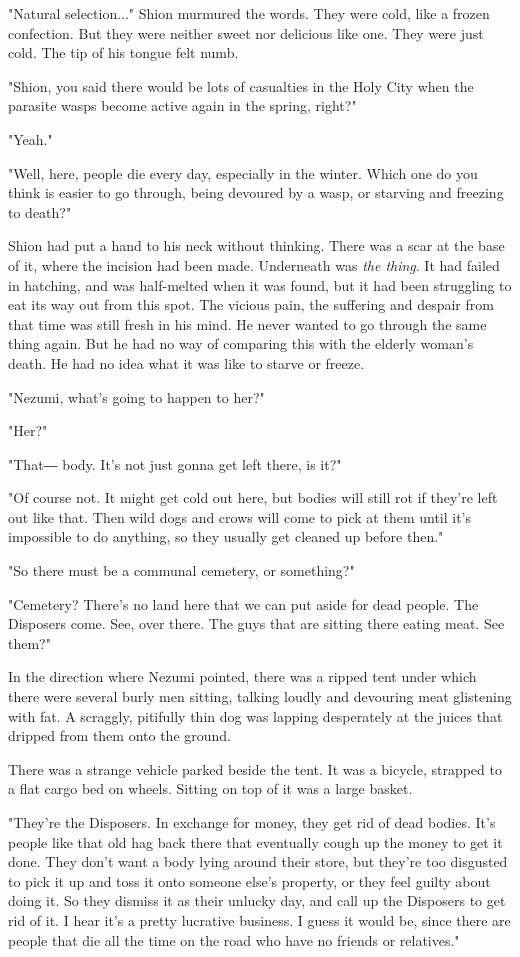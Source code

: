 "Natural selection..." Shion murmured the words. They were cold, like a
frozen confection. But they were neither sweet nor delicious like one.
They were just cold. The tip of his tongue felt numb.

"Shion, you said there would be lots of casualties in the Holy City when
the parasite wasps become active again in the spring, right?"

"Yeah."

"Well, here, people die every day, especially in the winter. Which one
do you think is easier to go through, being devoured by a wasp, or
starving and freezing to death?"

Shion had put a hand to his neck without thinking. There was a scar at
the base of it, where the incision had been made. Underneath was \emph{the
	thing}. It had failed in hatching, and was half-melted when it was found,
but it had been struggling to eat its way out from this spot. The
vicious pain, the suffering and despair from that time was still fresh
in his mind. He never wanted to go through the same thing again. But he
had no way of comparing this with the elderly woman's death. He had no
idea what it was like to starve or freeze.

"Nezumi, what's going to happen to her?"

"Her?"

"That― body. It's not just gonna get left there, is it?"

"Of course not. It might get cold out here, but bodies will still rot if
they're left out like that. Then wild dogs and crows will come to pick
at them until it's impossible to do anything, so they usually get
cleaned up before then."

"So there must be a communal cemetery, or something?"

"Cemetery? There's no land here that we can put aside for dead people.
The Disposers come. See, over there. The guys that are sitting there
eating meat. See them?"

In the direction where Nezumi pointed, there was a ripped tent under
which there were several burly men sitting, talking loudly and devouring
meat glistening with fat. A scraggly, pitifully thin dog was lapping
desperately at the juices that dripped from them onto the ground.

There was a strange vehicle parked beside the tent. It was a bicycle,
strapped to a flat cargo bed on wheels. Sitting on top of it was a large
basket.

"They're the Disposers. In exchange for money, they get rid of dead
bodies. It's people like that old hag back there that eventually cough
up the money to get it done. They don't want a body lying around their
store, but they're too disgusted to pick it up and toss it onto someone
else's property, or they feel guilty about doing it. So they dismiss it
as their unlucky day, and call up the Disposers to get rid of it. I hear
it's a pretty lucrative business. I guess it would be, since there are
people that die all the time on the road who have no friends or
relatives."

